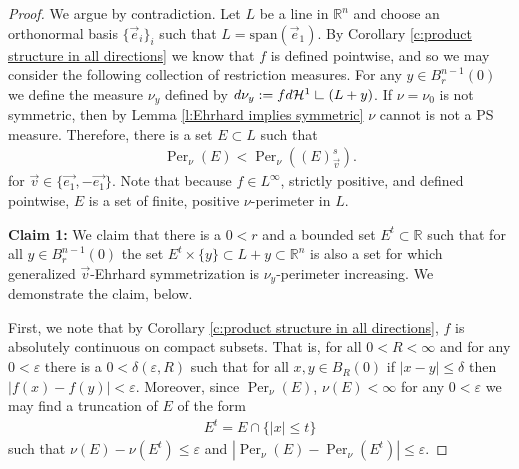\documentclass[12pt]{amsart}
\numberwithin{equation}{section}
\theoremstyle{plain}
\theoremstyle{definition}
\newcommand{\res}{\hbox{ {\vrule height .22cm}{\leaders\hrule\hskip.2cm} }}
\begin{document}
\begin{proof}
We argue by contradiction.  Let $L$ be a line in $\mathbb{R}^n$ and choose an orthonormal basis $\{\vec{e}_i\}_i$ such that $L = \text{span}(\vec{e}_1)$. By Corollary \ref{c:product structure in all directions} we know that $f$ is defined pointwise, and so we may consider the following collection of restriction measures.  For any $y \in B_{r}^{n-1}(0)$ we define the measure $\nu_y$ defined by $d\nu_y:= fd\mathcal{H}^1\res (L+y)$.  If $\nu = \nu_0$ is not symmetric, then by Lemma \ref{l:Ehrhard implies symmetric} $\nu$ cannot is not a PS measure.  Therefore, there is a set $E \subset L$ such that 
\begin{align}\label{e: perimeter inequality}
    \operatorname{Per}_{\nu}(E) < \operatorname{Per}_{\nu}((E)^s_{\vec{v}}).
\end{align} 
for $\vec{v} \in \{\vec{e_1}, -\vec{e_1} \}$.  Note that because $f \in L^{\infty}$, strictly positive, and defined pointwise, $E$ is a set of finite, positive $\nu$-perimeter in $L$. 

\textbf{Claim 1:} We claim that there is a $0<r$ and a bounded set $E^t \subset \mathbb{R}$ such that for all $y \in B_r^{n-1}(0)$ the set $E^t \times \{y\} \subset L +y \subset \mathbb{R}^n$ is also a set for which generalized $\vec{v}$-Ehrhard symmetrization is $\nu_y$-perimeter increasing. We demonstrate the claim, below.

First, we note that by Corollary \ref{c:product structure in all directions}, $f$ is absolutely continuous on compact subsets.  That is, for all $0<R<\infty$ and for any $0<\varepsilon$ there is a $0<\delta(\varepsilon, R)$ such that for all $x, y \in B_{R}(0)$ if $|x-y| \le \delta$ then $|f(x) - f(y)|< \varepsilon$. Moreover, since $\operatorname{Per}_{\nu}(E)$, $\nu(E)<\infty$ for any $0<\varepsilon$ we may find a truncation of $E$ of the form
\begin{align*}
    E^{t} = E \cap \{|x|\le t\}
\end{align*}
such that $\nu(E) - \nu(E^{t}) \le \varepsilon$ and $|\operatorname{Per}_{\nu}(E) - \operatorname{Per}_{\nu}(E^t)| \le \varepsilon$.


\end{proof}
\end{document}
